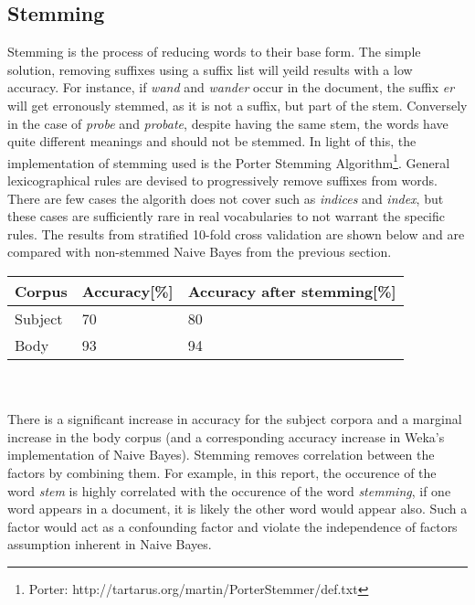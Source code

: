 \documentclass[12pt]{article}
\begin{document}
\subsection{Stemming}
Stemming is the process of reducing words to their base form. The simple solution, removing suffixes using a suffix list will yeild results with a low accuracy. For instance, if \emph{wand} and \emph{wander} occur in the document, the suffix \emph{er} will get erronously stemmed, as it is not a suffix, but part of the stem. Conversely in the case of \emph{probe} and \emph{probate}, despite having the same stem, the words have quite different meanings and should not be stemmed. In light of this, the implementation of stemming used is the Porter Stemming Algorithm\footnote{Porter: http://tartarus.org/martin/PorterStemmer/def.txt}. General lexicographical rules are devised to progressively remove suffixes from words. \\
There are few cases the algorith does not cover such as \emph{indices} and \emph{index}, but these cases are sufficiently rare in real vocabularies to not warrant the specific rules. The results from stratified 10-fold cross validation are shown below and are compared with non-stemmed Naive Bayes from the previous section.\\

\begin{tabular}{ | l | l | l | }
\hline
Corpus & Accuracy[\%] & Accuracy after stemming[\%]\\ \hline
Subject & 70 & 80  \\ \hline
Body & 93 & 94 \\ \hline
\end{tabular} \\\\

There is a significant increase in accuracy for the subject corpora and a marginal increase in the body corpus (and a corresponding accuracy increase in Weka's implementation of Naive Bayes). Stemming removes correlation between the factors by combining them. For example, in this report, the occurence of the word \emph{stem} is highly correlated with the occurence of the word \emph{stemming}, if one word appears in a document, it is likely the other word would appear also. Such a factor would act as a confounding factor and violate the independence of factors assumption inherent in Naive Bayes.
\end{document}
